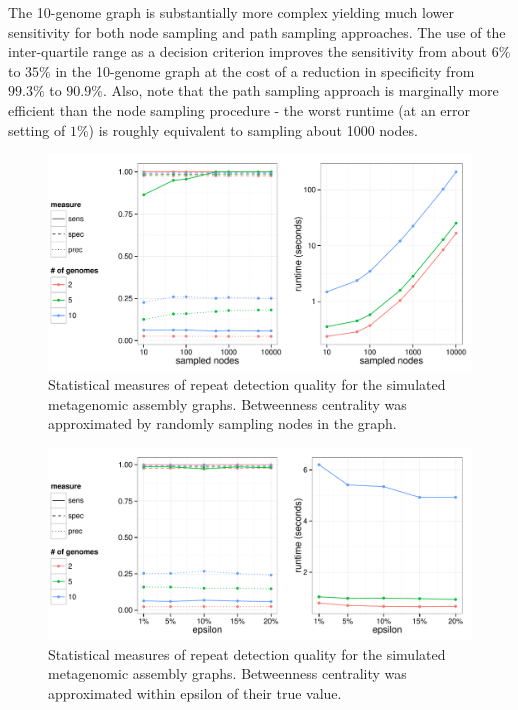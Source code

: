 \documentclass[runningheads,a4paper]{llncs}
\begin{document}
The 10-genome graph is substantially more complex yielding much lower sensitivity for both node sampling and path sampling approaches.  The use of the inter-quartile range as a decision criterion improves the sensitivity from about $6\%$ to $35\%$ in the 10-genome graph at the cost of a reduction in specificity from $99.3\%$ to $90.9\%$.  Also, note that the path sampling approach is marginally more efficient than the node sampling procedure  - the worst runtime (at an error setting of $1\%$) is roughly equivalent to sampling about 1000 nodes.

\begin{figure}[htbp]
\centering
\includegraphics[width = \textwidth]{sampled_nodes}
\caption{Statistical measures of repeat detection quality for the simulated metagenomic assembly graphs. Betweenness centrality was approximated by randomly sampling nodes in the graph.}
\label{fig:sampled_nodes}
\end{figure}

\begin{figure}[htbp]
\centering
\includegraphics[width = \textwidth]{sampled_paths}
\caption{Statistical measures of repeat detection quality for the simulated metagenomic assembly graphs. Betweenness centrality was approximated within epsilon of their true value.}
\label{fig:sampled_paths}
\end{figure}
\end{document}
